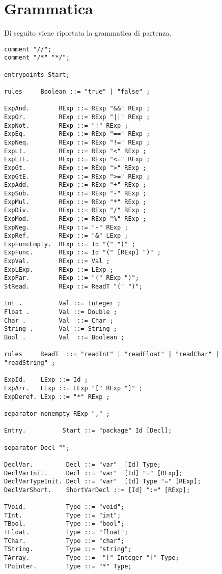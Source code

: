 \documentclass[12pt]{article}
\begin{document}
\section{Grammatica}
Di seguito viene riportata la grammatica di partenza.
\begin{verbatim}
comment "//";
comment "/*" "*/";

entrypoints Start;

rules     Boolean ::= "true" | "false" ;

ExpAnd.        RExp ::= RExp "&&" RExp ;
ExpOr.         RExp ::= RExp "||" RExp ;
ExpNot.        RExp ::= "!" RExp ;        
ExpEq.         RExp ::= RExp "==" RExp ;
ExpNeq.        RExp ::= RExp "!=" RExp ;
ExpLt.         RExp ::= RExp "<" RExp ;
ExpLtE.        RExp ::= RExp "<=" RExp ;
ExpGt.         RExp ::= RExp ">" RExp ;
ExpGtE.        RExp ::= RExp ">=" RExp ;
ExpAdd.        RExp ::= RExp "+" RExp ;
ExpSub.        RExp ::= RExp "-" RExp ;
ExpMul.        RExp ::= RExp "*" RExp ;
ExpDiv.        RExp ::= RExp "/" RExp ;
ExpMod.        RExp ::= RExp "%" RExp ;
ExpNeg.        RExp ::= "-" RExp ;
ExpRef.        RExp ::= "&" LExp ;
ExpFuncEmpty.  RExp ::= Id "(" ")" ;
ExpFunc.       RExp ::= Id "(" [RExp] ")" ;
ExpVal.        RExp ::= Val ;
ExpLExp.       RExp ::= LExp ;
ExpPar.        RExp ::= "(" RExp ")";
StRead.        RExp ::= ReadT "(" ")";

Int .          Val ::= Integer ;
Float .        Val ::= Double ;
Char .         Val  ::= Char ;
String .       Val ::= String ;
Bool .         Val  ::= Boolean ;

rules     ReadT  ::= "readInt" | "readFloat" | "readChar" | "readString" ;

ExpId.    LExp ::= Id ;
ExpArr.   LExp ::= LExp "[" RExp "]" ;
ExpDeref. LExp ::= "*" RExp ;

separator nonempty RExp "," ;

Entry.          Start ::= "package" Id [Decl];

separator Decl "";

DeclVar.         Decl ::= "var"  [Id] Type;
DeclVarInit.     Decl ::= "var"  [Id] "=" [RExp];
DeclVarTypeInit. Decl ::= "var"  [Id] Type "=" [RExp];
DeclVarShort.    ShortVarDecl ::= [Id] ":=" [RExp];

TVoid.           Type ::= "void";
TInt.            Type ::= "int";
TBool.           Type ::= "bool";
TFloat.          Type ::= "float";
TChar.           Type ::= "char";
TString.         Type ::= "string";
TArray.          Type ::=  "[" Integer "]" Type; 
TPointer.        Type ::= "*" Type; 


\end{verbatim}
\end{document}
